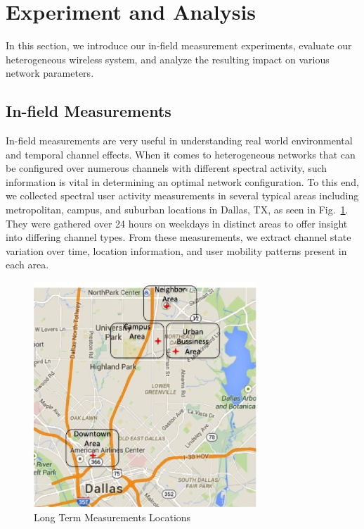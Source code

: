 \section{Experiment and Analysis}
\label{sec:experiment}

In this section, we introduce our in-field measurement experiments, evaluate our heterogeneous wireless system, and analyze the resulting impact on various network parameters.

\subsection{In-field Measurements}
\label{subsec:measurements}

In-field measurements are very useful in understanding real world environmental and temporal channel effects. 
When it comes to heterogeneous networks that can be configured over numerous channels with different spectral activity, such information is vital in determining an optimal network configuration. 
To this end, we collected spectral user activity measurements in several typical areas including metropolitan, campus, and suburban locations in Dallas, TX, as seen in Fig.~\ref{fig:measurement_map}. 
They were gathered over 24 hours on weekdays in distinct areas to offer insight into differing channel types. 
From these measurements, we extract channel state variation over time, location information, and user mobility patterns present in each area.

\begin{figure}
\vspace{-0.0in}
\centering
\includegraphics[width=84mm]{figures/measurements_map}
\vspace{-0.1in}
\caption{Long Term Measurements Locations}
\label{fig:measurement_map}
\vspace{-0.1in}
\end{figure}

